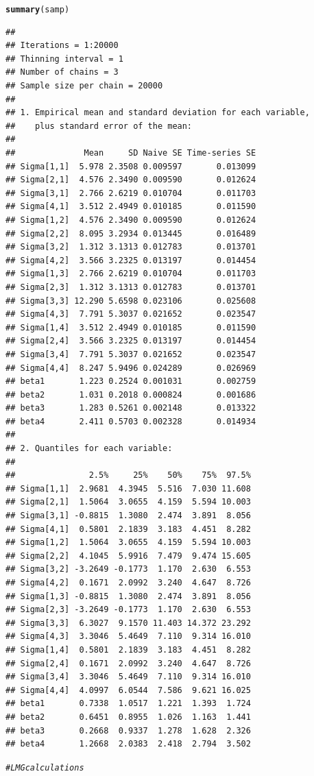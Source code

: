 \documentclass[11pt,a4paper,twoside]{book}
\makeatletter
\newcommand{\hlcom}[1]{\textcolor[rgb]{0.678,0.584,0.686}{\textit{#1}}}%
\newcommand{\hlstd}[1]{\textcolor[rgb]{0.345,0.345,0.345}{#1}}%
\newcommand{\hlkwd}[1]{\textcolor[rgb]{0.737,0.353,0.396}{\textbf{#1}}}%
\newenvironment{kframe}{%
 \def\at@end@of@kframe{}%
 \ifinner\ifhmode%
  \def\at@end@of@kframe{\end{minipage}}%
  \begin{minipage}{\columnwidth}%
 \fi\fi%
 \def\FrameCommand##1{\hskip\@totalleftmargin \hskip-\fboxsep
 \colorbox{shadecolor}{##1}\hskip-\fboxsep
     \hskip-\linewidth \hskip-\@totalleftmargin \hskip\columnwidth}%
 \MakeFramed {\advance\hsize-\width
   \@totalleftmargin\z@ \linewidth\hsize
   \@setminipage}}%
 {\par\unskip\endMakeFramed%
 \at@end@of@kframe}
\newenvironment{knitrout}{}{} %
\makeatother
\begin{document}
\begin{knitrout}
\begin{kframe}
\begin{alltt}
\hlkwd{summary}\hlstd{(samp)}
\end{alltt}
\begin{verbatim}
## 
## Iterations = 1:20000
## Thinning interval = 1 
## Number of chains = 3 
## Sample size per chain = 20000 
## 
## 1. Empirical mean and standard deviation for each variable,
##    plus standard error of the mean:
## 
##              Mean     SD Naive SE Time-series SE
## Sigma[1,1]  5.978 2.3508 0.009597       0.013099
## Sigma[2,1]  4.576 2.3490 0.009590       0.012624
## Sigma[3,1]  2.766 2.6219 0.010704       0.011703
## Sigma[4,1]  3.512 2.4949 0.010185       0.011590
## Sigma[1,2]  4.576 2.3490 0.009590       0.012624
## Sigma[2,2]  8.095 3.2934 0.013445       0.016489
## Sigma[3,2]  1.312 3.1313 0.012783       0.013701
## Sigma[4,2]  3.566 3.2325 0.013197       0.014454
## Sigma[1,3]  2.766 2.6219 0.010704       0.011703
## Sigma[2,3]  1.312 3.1313 0.012783       0.013701
## Sigma[3,3] 12.290 5.6598 0.023106       0.025608
## Sigma[4,3]  7.791 5.3037 0.021652       0.023547
## Sigma[1,4]  3.512 2.4949 0.010185       0.011590
## Sigma[2,4]  3.566 3.2325 0.013197       0.014454
## Sigma[3,4]  7.791 5.3037 0.021652       0.023547
## Sigma[4,4]  8.247 5.9496 0.024289       0.026969
## beta1       1.223 0.2524 0.001031       0.002759
## beta2       1.031 0.2018 0.000824       0.001686
## beta3       1.283 0.5261 0.002148       0.013322
## beta4       2.411 0.5703 0.002328       0.014934
## 
## 2. Quantiles for each variable:
## 
##               2.5%     25%    50%    75%  97.5%
## Sigma[1,1]  2.9681  4.3945  5.516  7.030 11.608
## Sigma[2,1]  1.5064  3.0655  4.159  5.594 10.003
## Sigma[3,1] -0.8815  1.3080  2.474  3.891  8.056
## Sigma[4,1]  0.5801  2.1839  3.183  4.451  8.282
## Sigma[1,2]  1.5064  3.0655  4.159  5.594 10.003
## Sigma[2,2]  4.1045  5.9916  7.479  9.474 15.605
## Sigma[3,2] -3.2649 -0.1773  1.170  2.630  6.553
## Sigma[4,2]  0.1671  2.0992  3.240  4.647  8.726
## Sigma[1,3] -0.8815  1.3080  2.474  3.891  8.056
## Sigma[2,3] -3.2649 -0.1773  1.170  2.630  6.553
## Sigma[3,3]  6.3027  9.1570 11.403 14.372 23.292
## Sigma[4,3]  3.3046  5.4649  7.110  9.314 16.010
## Sigma[1,4]  0.5801  2.1839  3.183  4.451  8.282
## Sigma[2,4]  0.1671  2.0992  3.240  4.647  8.726
## Sigma[3,4]  3.3046  5.4649  7.110  9.314 16.010
## Sigma[4,4]  4.0997  6.0544  7.586  9.621 16.025
## beta1       0.7338  1.0517  1.221  1.393  1.724
## beta2       0.6451  0.8955  1.026  1.163  1.441
## beta3       0.2668  0.9337  1.278  1.628  2.326
## beta4       1.2668  2.0383  2.418  2.794  3.502
\end{verbatim}
\begin{alltt}
\hlcom{#LMG calculations}


\end{alltt}
\end{kframe}
\end{knitrout}
\end{document}
